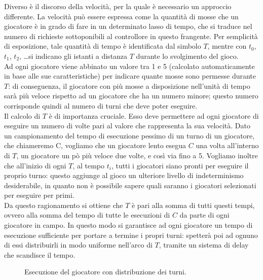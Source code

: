 Diverso è il discorso della velocità, per la quale è necessario un approccio differente. La velocità può essere espressa come la quantità di mosse che un giocatore è in grado di fare in un determinato lasso di tempo, che si traduce nel numero di richieste sottoponibili al controllore in questo frangente. Per semplicità di esposizione, tale quantità di tempo è identificata dal simbolo $T$, mentre con $t_0$, $t_1$, $t_2$, \ldots si indicano gli istanti a distanza $T$ durante lo svolgimento del gioco.\\

Ad ogni giocatore viene abbinato un valore tra 1 e 5 (calcolato automaticamente in base alle sue caratteristiche) per indicare quante mosse sono permesse durante $T$: di conseguenza, il giocatore con più mosse a disposizione nell'unità di tempo sarà più veloce rispetto ad un giocatore che ha un numero minore; questo numero corrisponde quindi al numero di turni che deve poter eseguire.\\

Il calcolo di $T$ è di importanza cruciale. Esso deve permettere ad ogni giocatore di eseguire un numero di volte pari al valore che rappresenta la sua velocità. Dato un campionamento del tempo di esecuzione pessimo di un turno di un giocatore, che chiameremo C, vogliamo che un giocatore lento esegua $C$ una volta all'interno di $T$, un giocatore un pò più veloce due volte, e così via fino a 5. Vogliamo inoltre che all'inizio di ogni $T$, al tempo $t_i$, tutti i giocatori siano pronti per eseguire il proprio turno: questo aggiunge al gioco un ulteriore livello di indeterminismo desiderabile, in quanto non è possibile sapere quali saranno i giocatori selezionati per eseguire per primi.\\

Da questo ragionamento si ottiene che $T$ è pari alla somma di tutti questi tempi, ovvero alla somma del tempo di tutte le esecuzioni di $C$ da parte di ogni giocatore in campo. In questo modo si garantisce ad ogni giocatore un tempo di esecuzione sufficiente per portare a termine i propri turni: spetterà poi ad ognuno di essi distribuirli in modo uniforme nell'arco di $T$, tramite un sistema di delay che scandisce il tempo.\\

\begin{figure}[htb!]
	\centering
	\exampleOne
	\caption{Esecuzione del giocatore con distribuzione dei turni.}
	\label{fig:hyperperiod_normal}
\end{figure}

